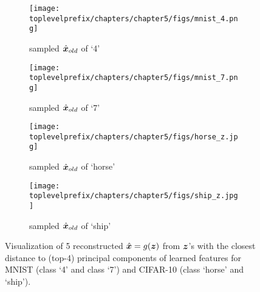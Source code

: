 \documentclass[../../book-main.tex]{subfiles}
\begin{document}
\begin{figure}[t]
    \begin{subfigure}[t]{0.20\textwidth}
        \centering
        \texttt{[image: \\toplevelprefix/chapters/chapter5/figs/mnist\_4.png]}
        \caption{sampled $\hat{\bm{x}}_{old}$ of `4'}
    \end{subfigure}
    \hfill
    \begin{subfigure}[t]{0.20\textwidth}
        \centering
        \texttt{[image: \\toplevelprefix/chapters/chapter5/figs/mnist\_7.png]}
        \caption{sampled $\hat{\bm{x}}_{old}$ of `7'}
    \end{subfigure}
    \hfill
    \begin{subfigure}[t]{0.20\textwidth}
        \centering
        \texttt{[image: \\toplevelprefix/chapters/chapter5/figs/horse\_z.jpg]}
        \caption{sampled $\hat{\bm{x}}_{old}$ of `horse'}
    \end{subfigure}
    \hfill
    \begin{subfigure}[t]{0.20\textwidth}
        \centering
        \texttt{[image: \\toplevelprefix/chapters/chapter5/figs/ship\_z.jpg]}
        \caption{sampled $\hat{\bm{x}}_{old}$ of `ship'}
    \end{subfigure}
    \caption{\small Visualization of 5 reconstructed $\hat {\bm{x}}=g(\bm{z})$ from $\bm{z}$'s with the closest distance to (top-4) principal components of learned features for {MNIST} (class ‘4’ and class ‘7’) and {CIFAR-10} (class ‘horse’ and  ‘ship’).}
    \label{fig:pca_sampling_main}
\end{figure}

\end{document}
